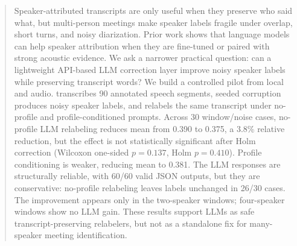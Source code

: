 \begin{abstract}
Speaker-attributed transcripts are only useful when they preserve who said what, but multi-person meetings make speaker labels fragile under overlap, short turns, and noisy diarization. Prior work shows that language models can help speaker attribution when they are fine-tuned or paired with strong acoustic evidence. We ask a narrower practical question: can a lightweight API-based LLM correction layer improve noisy speaker labels while preserving transcript words? We build a controlled pilot from local \amisdm and \simsamu audio. \asrmodel transcribes 90 annotated speech segments, seeded corruption produces noisy speaker labels, and \relabelmodel relabels the same transcript under no-profile and profile-conditioned prompts. Across 30 window/noise cases, no-profile LLM relabeling reduces mean \wder from 0.390 to 0.375, a 3.8\% relative reduction, but the effect is not statistically significant after Holm correction (Wilcoxon one-sided $p=0.137$, Holm $p=0.410$). Profile conditioning is weaker, reducing mean \wder to 0.381. The LLM responses are structurally reliable, with 60/60 valid JSON outputs, but they are conservative: no-profile relabeling leaves labels unchanged in 26/30 cases. The improvement appears only in the two-speaker \simsamu windows; four-speaker \amisdm windows show no LLM gain. These results support LLMs as safe transcript-preserving relabelers, but not as a standalone fix for many-speaker meeting identification.
\end{abstract}

